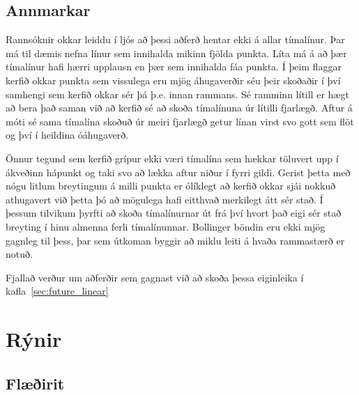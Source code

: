 \documentclass{article}
\begin{document}
\subsection{Annmarkar}

Rannsóknir okkar leiddu í ljós að þessi aðferð hentar ekki á allar tímalínur.
Þar má til dæmis nefna línur sem innihalda mikinn fjölda punkta.
Líta má á að þær tímalínur hafi \ilqq hærri\irqq \hspace{1pt} upplausn en þær sem innihalda fáa punkta. 
Í þeim flaggar kerfið okkar punkta sem vissulega eru mjög
áhugaverðir séu þeir skoðaðir í því samhengi sem kerfið okkar sér þá þ.e. innan
rammans. Sé ramminn lítill er hægt að bera það saman við að kerfið sé að skoða
tímalínuna úr lítilli fjarlægð. Aftur á móti sé sama tímalína skoðuð úr meiri
fjarlægð getur línan virst svo gott sem flöt og því í heildina óáhugaverð.

Önnur tegund sem kerfið grípur ekki væri tímalína sem hækkar töluvert upp í ákveðinn
hápunkt og taki svo að lækka aftur niður í fyrri gildi. Gerist þetta með nógu
litlum breytingum á milli punkta er ólíklegt að kerfið okkar sjái nokkuð
athugavert við þetta þó að mögulega hafi eitthvað merkilegt átt sér stað. 
Í þessum tilvikum þyrfti að skoða tímalínurnar út frá því hvort
það eigi sér stað breyting í hinu almenna ferli tímalínunnar. Bollinger böndin
eru ekki mjög gagnleg til þess, þar sem útkoman byggir að miklu leiti á hvaða
rammastærð er notuð. 

Fjallað verður um aðferðir sem gagnast við að skoða þessa eiginleika í kafla~\ref{sec:future_linear}



\section{Rýnir}
\subsection{Flæðirit}
\label{sec:flow_chart}
\end{document}
